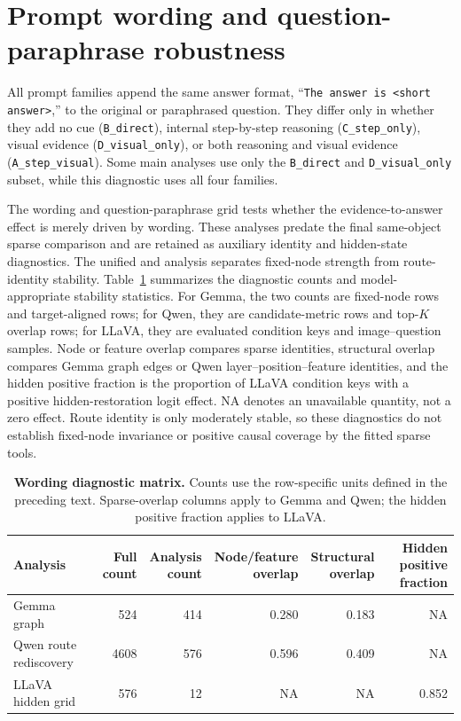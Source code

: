 \section{Prompt wording and question-paraphrase robustness}
\label{app:prompt-text}

All prompt families append the same answer format, ``\texttt{The answer is <short answer>},'' to the original or paraphrased question. They differ only in whether they add no cue (\texttt{B\_direct}), internal step-by-step reasoning (\texttt{C\_step\_only}), visual evidence (\texttt{D\_visual\_only}), or both reasoning and visual evidence (\texttt{A\_step\_visual}). Some main analyses use only the \texttt{B\_direct} and \texttt{D\_visual\_only} subset, while this diagnostic uses all four families.

The wording and question-paraphrase grid tests whether the evidence-to-answer effect is merely driven by wording. These analyses predate the final same-object sparse comparison and are retained as auxiliary identity and hidden-state diagnostics. The unified \modelgemma{} and \modelqwen{} analysis separates fixed-node strength from route-identity stability. Table~\ref{tab:wording-grid} summarizes the diagnostic counts and model-appropriate stability statistics. For Gemma, the two counts are fixed-node rows and target-aligned rows; for Qwen, they are candidate-metric rows and top-$K$ overlap rows; for LLaVA, they are evaluated condition keys and image--question samples. Node or feature overlap compares sparse identities, structural overlap compares Gemma graph edges or Qwen layer--position--feature identities, and the hidden positive fraction is the proportion of LLaVA condition keys with a positive hidden-restoration logit effect. NA denotes an unavailable quantity, not a zero effect. Route identity is only moderately stable, so these diagnostics do not establish fixed-node invariance or positive causal coverage by the fitted sparse tools.

\begin{table}[htbp]
\centering
\small
\caption{\textbf{Wording diagnostic matrix.} Counts use the row-specific units defined in the preceding text. Sparse-overlap columns apply to Gemma and Qwen; the hidden positive fraction applies to LLaVA.}
\label{tab:wording-grid}
\begin{tabular*}{\linewidth}{@{\extracolsep{\fill}}lrrrrr@{}}
\toprule
Analysis & \shortstack{Full\\count} & \shortstack{Analysis\\count} & \shortstack{Node/feature\\overlap} & \shortstack{Structural\\overlap} & \shortstack{Hidden positive\\fraction} \\
\midrule
Gemma graph & 524 & 414 & 0.280 & 0.183 & NA \\
Qwen route rediscovery & 4608 & 576 & 0.596 & 0.409 & NA \\
LLaVA hidden grid & 576 & 12 & NA & NA & 0.852 \\
\bottomrule
\end{tabular*}
\end{table}

